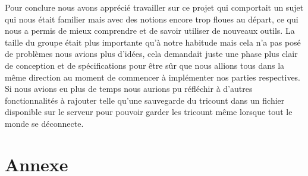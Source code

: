\documentclass[12,french]{report}
\begin{document}
Pour conclure nous avons apprécié travailler sur ce projet qui comportait un sujet qui nous était familier mais avec des notions encore trop floues au départ, ce qui nous a permis de mieux comprendre et de savoir utiliser de nouveaux outils. La taille du groupe était plus importante qu'à notre habitude mais cela n'a pas posé de problèmes nous avions plus d'idées, cela demandait juste une phase plus clair de conception et de spécifications pour être sûr que nous allions tous dans la même direction au moment de commencer à implémenter nos parties respectives.\\
Si nous avions eu plus de temps nous aurions pu réfléchir à d'autres fonctionnalités à rajouter telle qu'une sauvegarde du tricount dans un fichier disponible sur le serveur pour pouvoir garder les tricount même lorsque tout le monde se déconnecte. 


\chapter*{Annexe}
\end{document}
